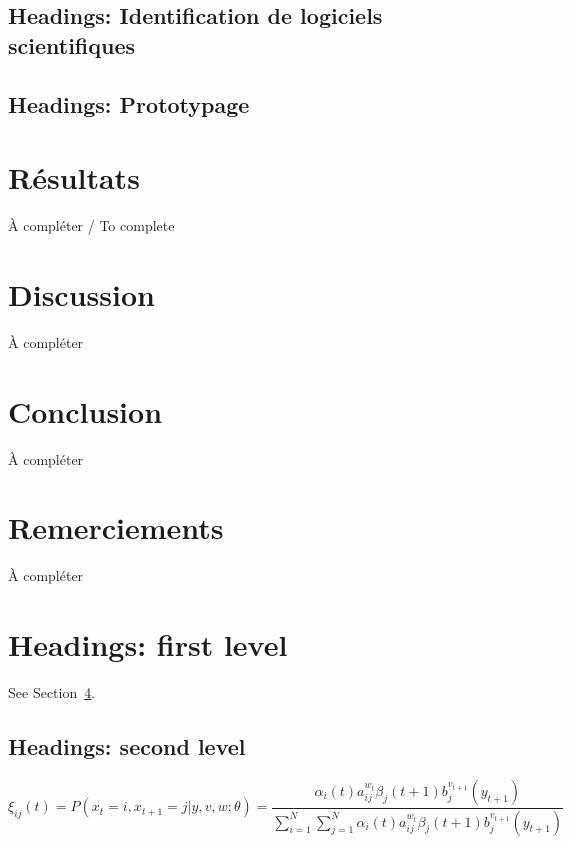 \documentclass{article}
\begin{document}

  \subsection{Headings: Identification de logiciels scientifiques}
  \label{subsec:headings:software-search}


  \subsection{Headings: Prototypage}
  \label{subsec:headings:prototyping}



  \section{Résultats}
  \label{sec:results}
  À compléter / To complete


  \section{Discussion}
  \label{sec:discussion}
  À compléter


  \section{Conclusion}
  À compléter

  \section*{Remerciements}
  À compléter

  
  




  \section{Headings: first level}
  \label{sec:headings}

  \lipsum[4] See Section~\ref{sec:headings}.

  \subsection{Headings: second level}
  \label{subsec:headings:second-level}
  \lipsum[5]
  \begin{equation}
    \xi _{ij}(t)=P(x_{t}=i,x_{t+1}=j|y,v,w;\theta)= {\frac {\alpha _{i}(t)a^{w_t}_{ij}\beta _{j}(t+1)b^{v_{t+1}}_{j}(y_{t+1})}{\sum _{i=1}^{N} \sum _{j=1}^{N} \alpha
    _{i}(t)a^{w_t}_{ij}\beta _{j}(t+1)b^{v_{t+1}}_{j}(y_{t+1})}}\label{eq:eq1}
  \end{equation}
\end{document}
